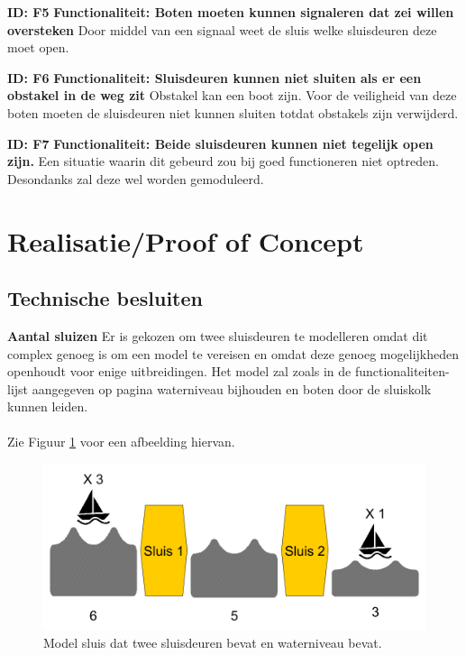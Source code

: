 \documentclass{article}
\begin{document}
\textbf{ID: F5} \newline
\textbf{Functionaliteit: Boten moeten kunnen signaleren dat zei willen oversteken} \newline
Door middel van een signaal weet de sluis welke sluisdeuren deze moet open. \newline

\textbf{ID: F6} \newline
\textbf{Functionaliteit: Sluisdeuren kunnen niet sluiten als er een obstakel in de weg zit} \newline
Obstakel kan een boot zijn. Voor de veiligheid van deze boten moeten de sluisdeuren niet kunnen sluiten totdat obstakels zijn verwijderd.  \newline

\textbf{ID: F7} \newline
\textbf{Functionaliteit: Beide sluisdeuren kunnen niet tegelijk open zijn.} \newline
Een situatie waarin dit gebeurd zou bij goed functioneren niet optreden. Desondanks zal deze wel worden gemoduleerd. \newline


\section{Realisatie/Proof of Concept}

\subsection{Technische besluiten}
\textbf{Aantal sluizen}\newline
Er is gekozen om twee sluisdeuren te modelleren omdat dit complex genoeg is om een model te vereisen en omdat deze genoeg mogelijkheden openhoudt voor enige uitbreidingen. Het model zal zoals in de functionaliteiten-lijst aangegeven op pagina \pageref{sec:FuncList} waterniveau bijhouden en boten door de sluiskolk kunnen leiden.\\\\
Zie Figuur \ref{fig:sluiceWaterLv} voor een afbeelding hiervan. 
\begin{figure}[!h]
	\centering
	\includegraphics[width=\textwidth]{images/sluis_model.png}
    \caption{Model sluis dat twee sluisdeuren bevat en waterniveau bevat.}
	\label{fig:sluiceWaterLv}
\end{figure}
\end{document}
